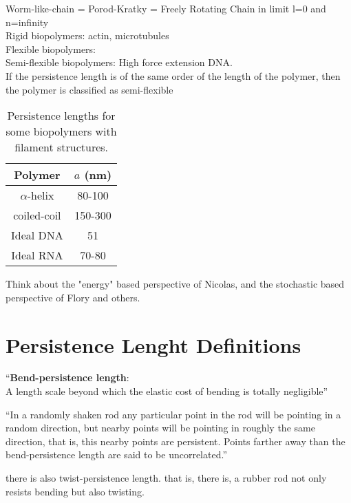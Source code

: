 Worm-like-chain = Porod-Kratky = Freely Rotating Chain in limit l=0
and n=infinity
\\

Rigid biopolymers:
actin, microtubules
\\

Flexible biopolymers:
\\

Semi-flexible biopolymers:
High force extension DNA.
\\

If the persistence length is of the same order of the length of the
polymer, then the polymer is classified as  semi-flexible


\begin{table}[htbp]
\begin{center}  
\begin{tabular}{c|c}
\hline
Polymer       & $a$ (nm)   \\ \hline
$\alpha$-helix & 80-100\\
coiled-coil & 150-300\\
Ideal DNA  &  51  \\
Ideal RNA & 70-80 \\
\hline
\end{tabular}
\caption{Persistence lengths for some biopolymers with filament structures.}
\end{center}
\end{table}

Think about the "energy" based perspective of Nicolas, and the
stochastic based perspective of Flory and others.




\section{Persistence Lenght Definitions}

``\textbf{Bend-persistence length}:\\ 
A length scale beyond which the elastic cost of bending is totally
negligible''

``In a randomly shaken rod any particular point in the rod will be
pointing in a random direction, but nearby points will be pointing in
roughly the same direction, that is, this nearby points are
persistent. Points farther away than the bend-persistence length are
said to be uncorrelated.''

there is also twist-persistence length.
that is, there is, a rubber rod not only resists bending but also twisting.

